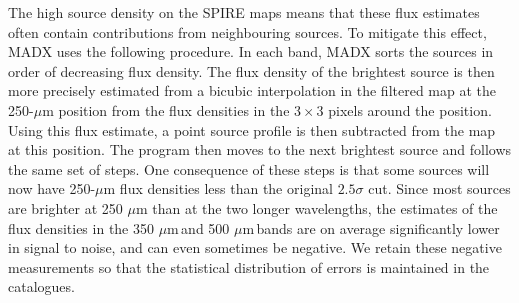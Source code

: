 \documentclass[useAMS,usenatbib]{mnras}
\def\mic{ $\mu $m\,}
\begin{document}
The high source density on the SPIRE maps means that these flux
estimates often contain contributions from neighbouring sources.  To
mitigate this effect, MADX uses the following procedure.  In each
band, MADX sorts the sources in order of decreasing flux density.  The
flux density of the brightest source is then more precisely estimated
from a bicubic interpolation in the filtered map at the 250-$\mu$m
position from the flux densities in the $3 \times 3$ pixels around the
position.  Using this flux estimate, a point source profile is then
subtracted from the map at this position. The program then moves to
the next brightest source and follows the same set of steps.  One
consequence of these steps is that some sources will now have
250-$\mu$m flux densities less than the original $2.5\sigma$ cut.
Since most sources are brighter at 250 $\mu$m than at the two longer
wavelengths, the estimates of the flux densities in the 350\mic and
500\mic bands are on average significantly lower in signal to noise,
and can even sometimes be negative. We retain these negative
measurements so that the statistical distribution of errors is
maintained in the catalogues. 
\end{document}

